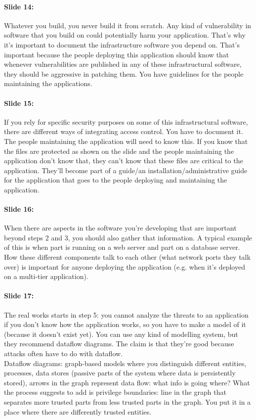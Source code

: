 \documentclass[10pt,a4paper]{report}
\begin{document}
\paragraph{Slide 14:} Whatever you build, you never build it from scratch. Any kind of vulnerability in software that you build on could potentially harm your application. That's why it's important to document the infrastructure software you depend on. That's important because the people deploying this application should know that whenever vulnerabilities are published in any of these infrastructural software, they should be aggressive in patching them. You have guidelines for the people maintaining the applications. 

\paragraph{Slide 15:} If you rely for specific security purposes on some of this infrastructural software, there are different ways of integrating access control. You have to document it. The people maintaining the application will need to know this. If you know that the files are protected as shown on the slide and the people maintaining the application don't know that, they can't know that these files are critical to the application. They'll become part of a guide/an installation/administrative guide for the application that goes to the people deploying and maintaining the application.

\paragraph{Slide 16:} When there are aspects in the software you're developing that are important beyond steps 2 and 3, you should also gather that information. A typical example of this is when part is running on a web server and part on a database server. How these different components talk to each other (what network ports they talk over) is important for anyone deploying the application (e.g. when it's deployed on a multi-tier application). 

\paragraph{Slide 17:} The real works starts in step 5: you cannot analyze the threats to an application if you don't know how the application works, so you have to make a model of it (because it doesn't exist yet). You can use any kind of modelling system, but they recommend dataflow diagrams. The claim is that they're good because attacks often have to do with dataflow. \\
Dataflow diagrams: graph-based models where you distinguish different entities, processes, data stores (passive parts of the system where data is persistently stored), arrows in the graph represent data flow: what info is going where? What the process suggests to add is privilege boundaries: line in the graph that separates more trusted parts from less trusted parts in the graph. You put it in a place where there are differently trusted entities.
\end{document}
